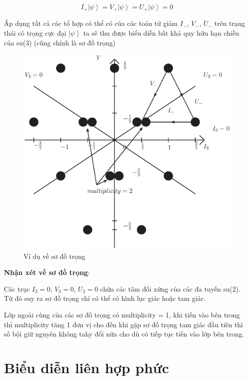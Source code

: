 \documentclass{report}
\begin{document}
\[ I_{+} \left| \psi \right\rangle = V_{+} \left| \psi \right\rangle = U_{+} \left| \psi \right\rangle = 0 \]

Áp dụng tất cả các tổ hợp có thể có của các toán tử giảm \( I_{-} \), \( V_{-} \), \( U_{-} \) trên trạng thái có trọng cực đại \( \left| \psi \right\rangle \) ta sẽ thu được biểu diễn bất khả quy hữu hạn chiều của su(3) (cũng chính là sơ đồ trọng)

	\begin{figure}[!htb]
		\centering
		\includegraphics[scale=0.5]{diagram4.eps}
		\caption{Ví dụ về sơ đồ trọng}
	\end{figure}
	
\textbf{Nhận xét về sơ đồ trọng}:

Các trục \( I_{3} = 0 \), \( V_{3} = 0 \), \( U_{3} = 0 \) chứa các tâm đối xứng của các đa tuyến su(2). Từ đó suy ra sơ đồ trọng chỉ có thể có hình lục giác hoặc tam giác.

Lớp ngoài cùng của các sơ đồ trọng có multiplicity = 1, khi tiến vào bên trong thì multiplicity tăng 1 đơn vị cho đến khi gặp sơ đồ trọng tam giác đầu tiên thì số bội giữ nguyên không tahy đổi nữa cho dù có tiếp tục tiến vào lớp bên trong.

\section{Biểu diễn liên hợp phức}
\end{document}
